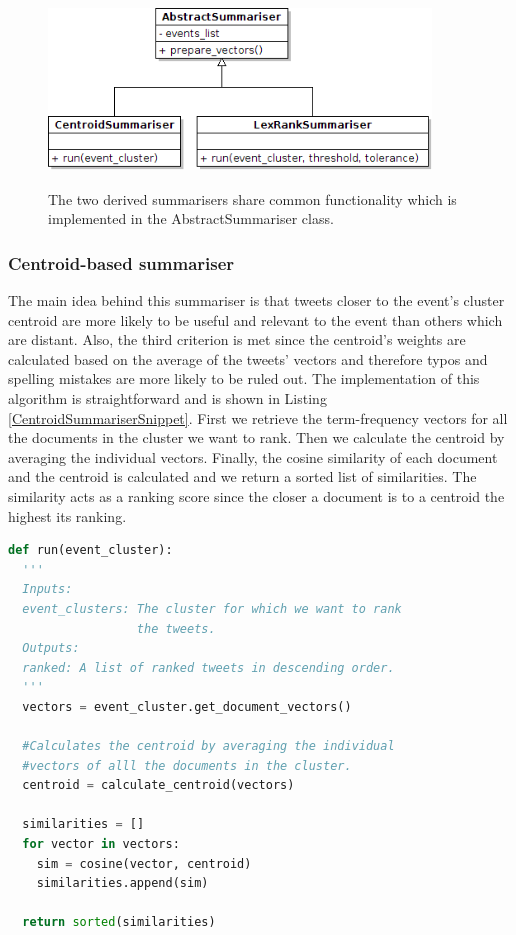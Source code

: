 \begin{figure}[htbp]
  \begin{center}
    \includegraphics[height=2.0in, width=4in]{summarisers}
    \caption{The two derived summarisers share common functionality which is implemented in the AbstractSummariser class. }
    \label{SummariserArchitecture}
  \end{center}
\end{figure} 

\subsubsection{Centroid-based summariser}
The main idea behind this summariser is that tweets closer to the event's cluster centroid are more likely to be useful and relevant to the event than others which are distant. Also, the third criterion is met since the centroid's weights are calculated based on the average of the tweets' vectors and therefore typos and spelling mistakes are more likely to be ruled out. The implementation of this algorithm is straightforward and is shown in Listing \ref{CentroidSummariserSnippet}. First we retrieve the term-frequency vectors for all the documents in the cluster we want to rank. Then we calculate the centroid by averaging the individual vectors. Finally, the cosine similarity of each document and the centroid is calculated and we return a sorted list of similarities. The similarity acts as a ranking score since the closer a document is to a centroid the highest its ranking.  

\begin{lstlisting}[language=Python, label=CentroidSummariserSnippet, caption=Pseudocode for the centoid-based summariser.]
def run(event_cluster):
  '''
  Inputs:
  event_clusters: The cluster for which we want to rank 
                  the tweets.
  Outputs:
  ranked: A list of ranked tweets in descending order. 
  '''        
  vectors = event_cluster.get_document_vectors()
  
  #Calculates the centroid by averaging the individual
  #vectors of alll the documents in the cluster.
  centroid = calculate_centroid(vectors)
  
  similarities = []
  for vector in vectors:
    sim = cosine(vector, centroid)
    similarities.append(sim)
  
  return sorted(similarities)
  
\end{lstlisting}

